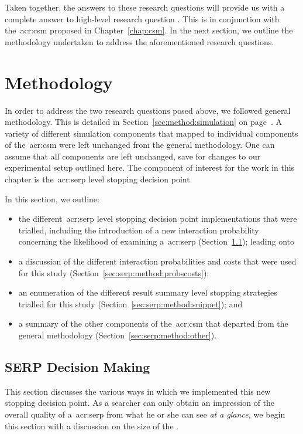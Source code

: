 Taken together, the answers to these research questions will provide us with a complete answer to high-level research question . This is in conjunction with the~\gls{acr:csm} proposed in Chapter~\ref{chap:csm}. In the next section, we outline the methodology undertaken to address the aforementioned research questions.

\section{Methodology}
In order to address the two research questions posed above, we followed general methodology. This is detailed in Section~\ref{sec:method:simulation} on page~\pageref{sec:method:simulation}. A variety of different simulation components that mapped to individual components of the~\gls{acr:csm} were left unchanged from the general methodology. One can assume that all components are left unchanged, save for changes to our experimental setup outlined here. The component of interest for the work in this chapter is the~\gls{acr:serp} level stopping decision point.

In this section, we outline:

\begin{itemize}
    \item{the different~\gls{acr:serp} level stopping decision point implementations that were trialled, including the introduction of a new interaction probability concerning the likelihood of examining a~\gls{acr:serp} (Section~\ref{sec:serp:method:serp_dp}); leading onto}
    \item{a discussion of the different interaction probabilities and costs that were used for this study (Section~\ref{sec:serp:method:probscosts});}
    \item{an enumeration of the different result summary level stopping strategies trialled for this study (Section~\ref{sec:serp:method:snippet}); and}
    \item{a summary of the other components of the~\gls{acr:csm} that departed from the general methodology (Section~\ref{sec:serp:method:other}).}
\end{itemize}

\subsection{SERP Decision Making}\label{sec:serp:method:serp_dp}
This section discusses the various ways in which we implemented this new stopping decision point. As a searcher can only obtain an impression of the overall quality of a~\gls{acr:serp} from what he or she can see \emph{at a glance,} we begin this section with a discussion on the size of the .

